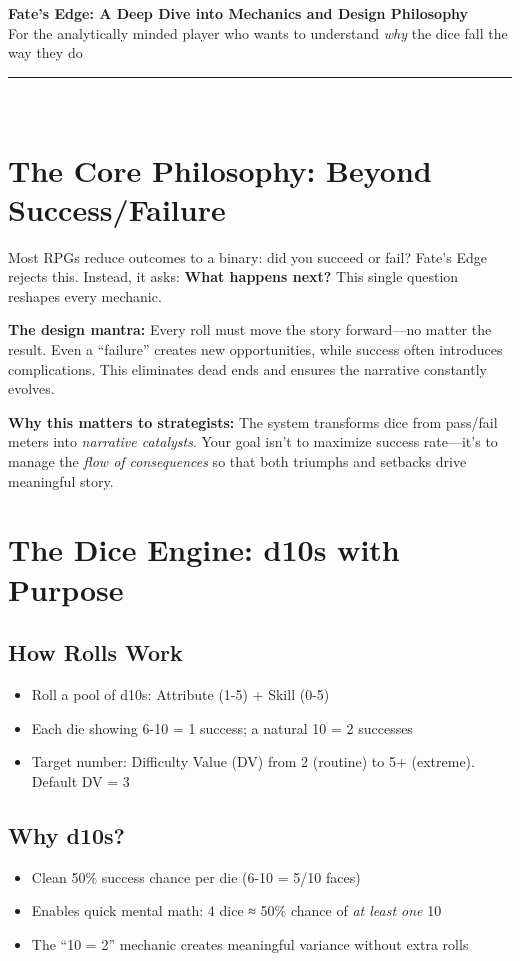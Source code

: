 \documentclass[11pt]{article}
\begin{document}
\begin{center}
    {\LARGE\bfseries Fate's Edge: A Deep Dive into Mechanics and Design Philosophy}\\[0.5em]
    {\large For the analytically minded player who wants to understand \textit{why} the dice fall the way they do}\\[1.5em]
    \rule{0.6\textwidth}{0.5pt}\\[1em]
\end{center}

\section{The Core Philosophy: Beyond Success/Failure}

Most RPGs reduce outcomes to a binary: did you succeed or fail? Fate's Edge rejects this. Instead, it asks: \textbf{What happens next?} This single question reshapes every mechanic.

\textbf{The design mantra:} Every roll must move the story forward---no matter the result. Even a ``failure'' creates new opportunities, while success often introduces complications. This eliminates dead ends and ensures the narrative constantly evolves.

\textbf{Why this matters to strategists:} The system transforms dice from pass/fail meters into \textit{narrative catalysts}. Your goal isn't to maximize success rate---it's to manage the \textit{flow of consequences} so that both triumphs and setbacks drive meaningful story.

\section{The Dice Engine: d10s with Purpose}

\subsection{How Rolls Work}
\begin{itemize}
    \item Roll a pool of d10s: Attribute (1-5) + Skill (0-5)
    \item Each die showing 6-10 = 1 success; a natural 10 = 2 successes
    \item Target number: Difficulty Value (DV) from 2 (routine) to 5+ (extreme). Default DV = 3
\end{itemize}

\subsection{Why d10s?}
\begin{itemize}
    \item Clean 50\% success chance per die (6-10 = 5/10 faces)
    \item Enables quick mental math: 4 dice ≈ 50\% chance of \textit{at least one} 10
    \item The ``10 = 2'' mechanic creates meaningful variance without extra rolls
\end{itemize}
\end{document}
